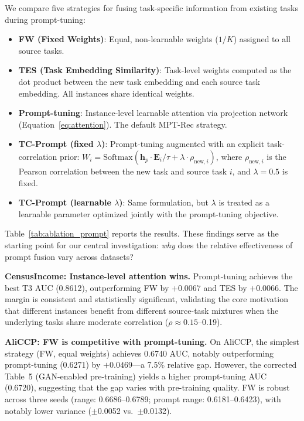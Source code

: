 \documentclass[review,anonymous]{acmart}
\begin{document}
We compare five strategies for fusing task-specific information from existing
tasks during prompt-tuning:

\begin{itemize}
  \item \textbf{FW (Fixed Weights)}: Equal, non-learnable weights ($1/K$) assigned
    to all source tasks.
  \item \textbf{TES (Task Embedding Similarity)}: Task-level weights computed
    as the dot product between the new task embedding and each source task
    embedding. All instances share identical weights.
  \item \textbf{Prompt-tuning}: Instance-level learnable attention via projection
    network (Equation~\ref{eq:attention}). The default MPT-Rec strategy.
  \item \textbf{TC-Prompt (fixed $\lambda$)}: Prompt-tuning augmented with an
    explicit task-correlation prior:
    $W_i = \text{Softmax}(\mathbf{h}_p \cdot \mathbf{E}_i / \tau + \lambda \cdot \rho_{\text{new},i})$,
    where $\rho_{\text{new},i}$ is the Pearson correlation between the new task
    and source task $i$, and $\lambda=0.5$ is fixed.
  \item \textbf{TC-Prompt (learnable $\lambda$)}: Same formulation, but $\lambda$
    is treated as a learnable parameter optimized jointly with the prompt-tuning
    objective.
\end{itemize}

Table~\ref{tab:ablation_prompt} reports the results. These findings serve as
the starting point for our central investigation: \emph{why} does the relative
effectiveness of prompt fusion vary across datasets?

\textbf{CensusIncome: Instance-level attention wins.} Prompt-tuning achieves the
best T3 AUC (0.8612), outperforming FW by $+0.0067$ and TES by $+0.0066$. The
margin is consistent and statistically significant, validating the core motivation
that different instances benefit from different source-task mixtures when the
underlying tasks share moderate correlation ($\rho \approx 0.15$--0.19).

\textbf{AliCCP: FW is competitive with prompt-tuning.} On AliCCP, the
simplest strategy (FW, equal weights) achieves 0.6740 AUC, notably
outperforming prompt-tuning (0.6271) by $+0.0469$---a 7.5\% relative gap.
However, the corrected Table~5 (GAN-enabled pre-training) yields a higher
prompt-tuning AUC (0.6720), suggesting that the gap varies with pre-training
quality. FW is robust across three seeds (range: 0.6686--0.6789; prompt range:
0.6181--0.6423), with notably lower variance ($\pm$0.0052 vs.\ $\pm$0.0132).
\end{document}

